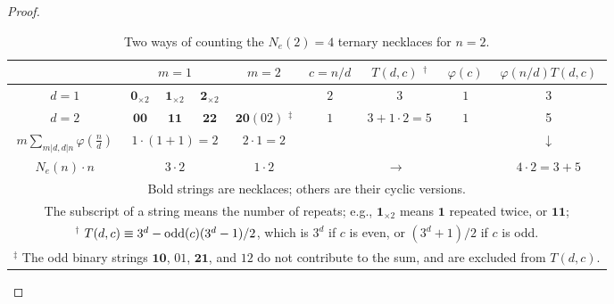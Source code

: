 \documentclass[preprint]{revtex4-1}
\begin{document}
\begin{proof}
\begin{table}[h]\footnotesize
\caption{Two ways of counting the $N_e(2) = 4$ ternary necklaces for $n = 2$.
}
\begin{center}
\begin{tabularx}{\textwidth}{c | c  c c | c  | c | c | c | c }
\hline
        & \multicolumn{3}{c|}{$m = 1$}
        & $m = 2$
        & $c = n/d$
        & $T(d, c)$ $^\dagger$
        & $\varphi(c)$ & $\varphi(n/d) T(d, c)$\\
\hline
$d = 1$ & \hspace{1mm} $\mathbf{0}_{\times2}$ \hspace{1mm}
        & \hspace{1mm} $\mathbf{1}_{\times2}$ \hspace{1mm}
        & \hspace{1mm} $\mathbf{2}_{\times2}$ \hspace{1mm}
        & & $2$ & $3$ & $1$ & 3 \\
\hline
$d = 2$ & $\mathbf{00}$
        & $\mathbf{11}$
        & $\mathbf{22}$
        & \hspace{1mm} $\mathbf{20} (02)$ $^\ddagger$ \hspace{1mm}
        & $1$ & $3+1\cdot2=5$ & $1$ & 5 \\
\hline
$m \sum_{m|d, d|n} \varphi(\frac{n}{d})$
      & \multicolumn{3}{c|}{$1\cdot(1+1) = 2$}
      & $2\cdot1 = 2$ &    \multicolumn{3}{c|}{} &  $\downarrow$\\
\hline
$N_e(n)\cdot n$
    & \multicolumn{3}{c|}{$3 \cdot 2$} & $1 \cdot 2$ &
  \multicolumn{3}{c|}{$\rightarrow$} & $4\cdot2 = 3 + 5$ \\
\hline
\multicolumn{9}{p{\linewidth}}{
  Bold strings are necklaces; others are their cyclic versions.
}
\\
\multicolumn{9}{p{\linewidth}}{
The subscript of a string means the number of repeats;
e.g.,
$\mathbf{1}_{\times2}$ means $\mathbf{1}$ repeated twice, or $\mathbf{11}$;
}
\\
\multicolumn{9}{p{\linewidth}}{
$^\dagger$ $T(d, c) \equiv 3^d - \mathrm{odd}(c)(3^d-1)/2$,
which is $3^d$ if $c$ is even,
or $(3^d+1)/2$ if $c$ is odd.
}
\\
\multicolumn{9}{p{\linewidth}}{
$^\ddagger$
The odd binary strings $\mathbf{10}$, $01$, $\mathbf{21}$, and $12$
  do not contribute to the sum, and are excluded from $T(d, c)$.
}
\\
\hline
\end{tabularx}
\end{center}
\label{tab:countcubnecklace}
\end{table}






\end{proof}
\end{document}

